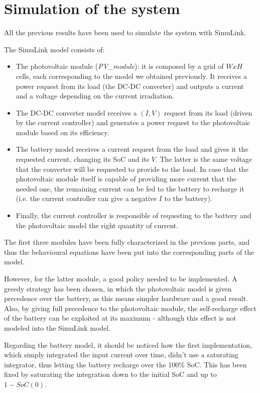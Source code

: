 \section{Simulation of the system}
All the previous results have been used to simulate the system with SimuLink.

The SimuLink model consists of:
\begin{itemize}
\item The photovoltaic module (\emph{PV\_module}): it is composed by a grid of $WxH$ cells, each corresponding to the model we obtained previously. It receives a power request from its load (the DC-DC converter) and outputs a current and a voltage depending on the current irradiation.
\item The DC-DC converter model receives a $(I,V)$ request from its load (driven by the current controller) and generates a power request to the photovoltaic module based on its efficiency. 
\item The battery model receives a current request from the load and gives it the requested current, changing its SoC and its $V$. The latter is the same voltage that the converter will be requested to provide to the load. In case that the photovoltaic module itself is capable of providing more current that the needed one, the remaining current can be fed to the battery to recharge it (i.e. the current controller can give a negative $I$ to the battery).
\item Finally, the current controller is responsible of requesting to the battery and the photovoltaic model the right quantity of current.
\end{itemize}

The first three modules have been fully characterized in the previous parts, and thus the behavioural equations have been put into the corresponding parts of the model.

However, for the latter module, a good policy needed to be implemented. A greedy strategy has been chosen, in which the photovoltaic model is given precedence over the battery, as this means simpler hardware and a good result. Also, by giving full precedence to the photovoltaic module, the self-recharge effect of the battery can be exploited at its maximum - although this effect is not modeled into the SimuLink model.

Regarding the battery model, it should be noticed how the first implementation, which simply integrated the input current over time, didn't use a saturating integrator, thus letting the battery recharge over the 100\% SoC. This has been fixed by saturating the integration down to the initial SoC and up to $1-SoC(0)$.

